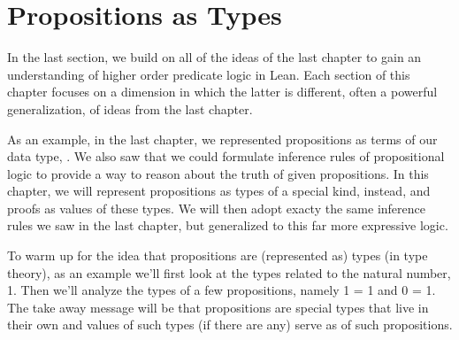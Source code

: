 \documentclass[letterpaper,10pt,english]{sphinxmanual}
\begin{document}
\section{Propositions as Types}
\label{\detokenize{A_02_Constructive_Logic:propositions-as-types}}
\sphinxAtStartPar
In the last section, we build on all of the ideas of
the last chapter to gain an understanding of higher
order predicate logic in Lean. Each section of this
chapter focuses on a dimension in which the latter is
different, often a powerful generalization, of ideas
from the last chapter.

\sphinxAtStartPar
As an example, in the last chapter, we represented
propositions as terms of our data type, .
We  also saw that we could formulate inference rules of
propositional logic to provide a way to reason about
the truth of given propositions. In this chapter, we
will represent propositions as types of a special kind,
instead, and proofs as values of these types. We will
then adopt exacty the same inference rules we saw in
the last chapter, but generalized to this far more
expressive logic.

\sphinxAtStartPar
To warm up for the idea that propositions are (represented as)
types (in type theory), as an example we’ll first look at the
types related to the natural number, 1. Then we’ll analyze the
types of a few propositions, namely 1 = 1 and 0 = 1. The take
away message will be that propositions are special types that
live in their own  and values of such types (if
there are any) serve as  of such propositions.
\end{document}
